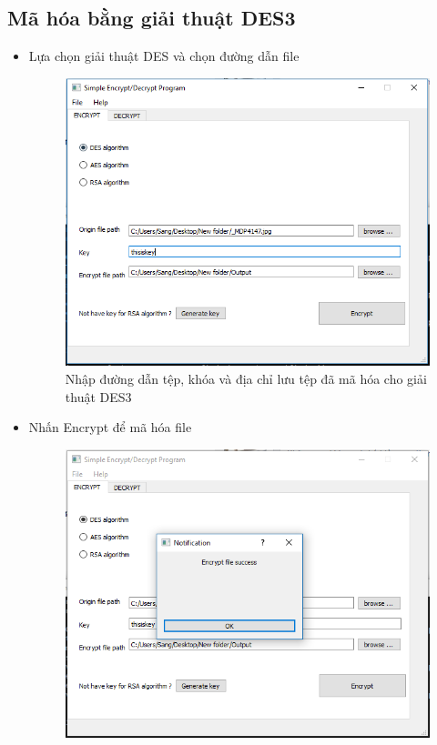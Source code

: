 \documentclass[a4paper]{article}
\begin{document}
\subsection{Mã hóa bằng giải thuật DES3} 
\begin{itemize}
\item
Lựa chọn giải thuật DES và chọn đường dẫn file
\begin{center}
    \begin{figure}[H]
    \begin{center}
     \includegraphics[scale=.5]{hinh/des-2}
    \end{center}
    \caption{Nhập đường dẫn tệp, khóa và địa chỉ lưu tệp đã mã hóa cho giải thuật DES3}
    \label{refhinh4}
    \end{figure}
\end{center}
\item
Nhấn Encrypt để mã hóa file
\begin{center}
    \begin{figure}[H]
    \begin{center}
     \includegraphics[scale=.5]{hinh/des-3}

\end{center}
\end{figure}
\end{center}
\end{itemize}
\end{document}
